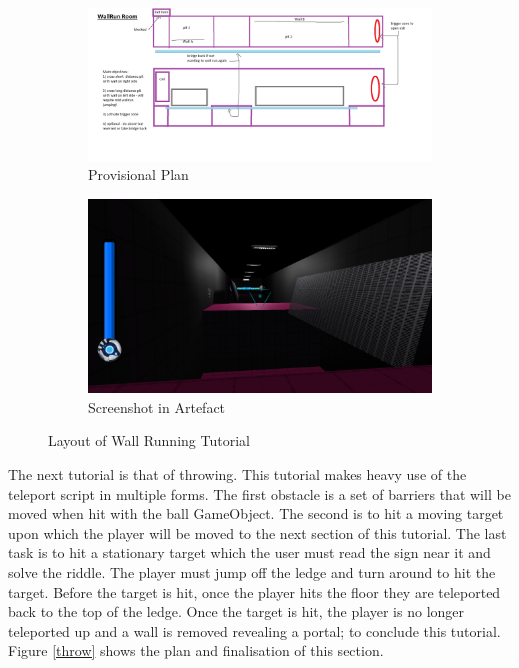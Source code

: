 \begin{figure}[H]
\centering
\begin{subfigure}{0.45\textwidth}
  \centering
  \includegraphics[width=1\linewidth]{Figures/wallplan.png}
  \caption{Provisional Plan}
\end{subfigure}%
\begin{subfigure}{0.45\textwidth}
  \centering
  \includegraphics[width=1\linewidth]{Figures/wall.png}
  \caption{Screenshot in Artefact}
\end{subfigure}
\caption{Layout of Wall Running Tutorial}
\label{wallrun}
\end{figure}

\noindent The next tutorial is that of throwing. This tutorial makes heavy use of the teleport script in multiple forms. The first obstacle is a set of barriers that will be moved when hit with the ball GameObject. The second is to hit a moving target upon which the player will be moved to the next section of this tutorial. The last task is to hit a stationary target which the user must read the sign near it and solve the riddle. The player must jump off the ledge and turn around to hit the target. Before the target is hit, once the player hits the floor they are teleported back to the top of the ledge. Once the target is hit, the player is no longer teleported up and a wall is removed revealing a portal; to conclude this tutorial. Figure \ref{throw} shows the plan and finalisation of this section.

